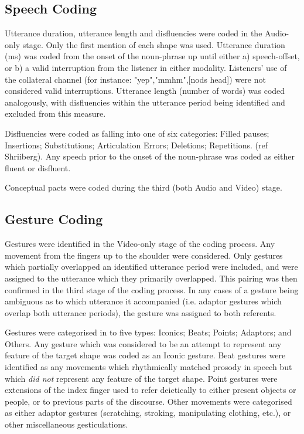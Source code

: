 \documentclass[a4paper,man,natbib]{apa6}
\begin{document}
\subsection{Speech Coding}
Utterance duration, utterance length and disfluencies were coded in the Audio-only stage.
Only the first mention of each shape was used. 
Utterance duration (ms) was coded from the onset of the noun-phrase up until either a) speech-offset, or b) a valid interruption from the listener in either modality.
Listeners' use of the collateral channel (for instance: "yep","mmhm",[nods head]) were not considered valid interruptions.
Utterance length (number of words) was coded analogously, with disfluencies within the utterance period being identified and excluded from this measure.

Disfluencies were coded as falling into one of six categories: Filled pauses; Insertions; Substitutions; Articulation Errors; Deletions; Repetitions. 
(ref Shriiberg).
Any speech prior to the onset of the noun-phrase was coded as either fluent or disfluent.

Conceptual pacts were coded during the third (both Audio and Video) stage. 



\subsection{Gesture Coding}
Gestures were identified in the Video-only stage of the coding process.
Any movement from the fingers up to the shoulder were considered. 
Only gestures which partially overlapped an identified utterance period were included, and were assigned to the utterance which they primarily overlapped. 
This pairing was then confirmed in the third stage of the coding process. 
In any cases of a gesture being ambiguous as to which utterance it accompanied (i.e. adaptor gestures which overlap both utterance periods), the gesture was assigned to both referents.

Gestures were categorised in to five types: Iconics; Beats; Points; Adaptors; and Others. 
Any gesture which was considered to be an attempt to represent any feature of the target shape was coded as an Iconic gesture.
Beat gestures were identified as any movements which rhythmically matched prosody in speech but which \emph{did not} represent any feature of the target shape.
Point gestures were extensions of the index finger used to refer deictically to either present objects or people, or to previous parts of the discourse.
Other movements were categorised as either adaptor gestures (scratching, stroking, manipulating clothing, etc.), or other miscellaneous gesticulations.
\end{document}
